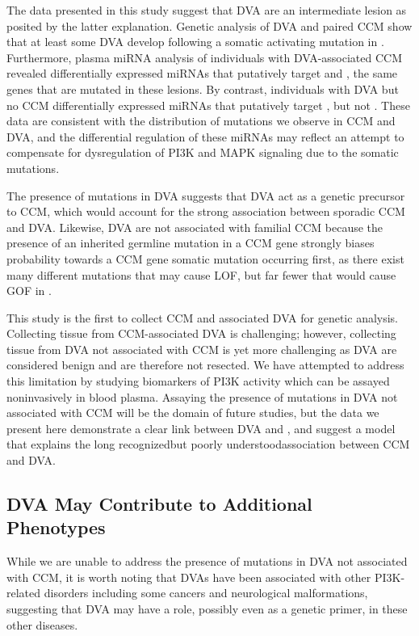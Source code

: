 The data presented in this study suggest that DVA are an intermediate lesion as posited by the latter explanation. Genetic analysis of DVA and paired CCM show that at least some DVA develop following a somatic activating mutation in . Furthermore, plasma miRNA analysis of individuals with DVA-associated CCM revealed differentially expressed miRNAs that putatively target  and , the same genes that are mutated in these lesions. By contrast, individuals with DVA but no CCM differentially expressed miRNAs that putatively target , but not . These data are consistent with the distribution of mutations we observe in CCM and DVA, and the differential regulation of these miRNAs may reflect an attempt to compensate for dysregulation of PI3K and MAPK signaling due to the somatic mutations. 

The presence of  mutations in DVA suggests that DVA act as a genetic precursor to CCM, which would account for the strong association between sporadic CCM and DVA. Likewise, DVA are not associated with familial CCM because the presence of an inherited germline mutation in a CCM gene strongly biases probability towards a CCM gene somatic mutation occurring first, as there exist many different mutations that may cause LOF, but far fewer that would cause GOF in . 

This study is the first to collect CCM and associated DVA for genetic analysis. Collecting tissue from CCM-associated DVA is challenging; however, collecting tissue from DVA not associated with CCM is yet more challenging as DVA are considered benign and are therefore not resected. We have attempted to address this limitation by studying biomarkers of PI3K activity which can be assayed noninvasively in blood plasma. Assaying the presence of  mutations in DVA not associated with CCM will be the domain of future studies, but the data we present here demonstrate a clear link between DVA and , and suggest a model that explains the long recognized\textemdash but poorly understood\textemdash association between CCM and DVA. 

\subsection{DVA May Contribute to Additional Phenotypes}
While we are unable to address the presence of  mutations in DVA not associated with CCM, it is worth noting that DVAs have been associated with other PI3K-related disorders\citep{brinjikji2018, dhamija2018, rasalkar2010, roux2020, santucci2008, tan2007, ucler2019} including some cancers and neurological malformations, suggesting that DVA may have a role, possibly even as a genetic primer, in these other diseases. 



